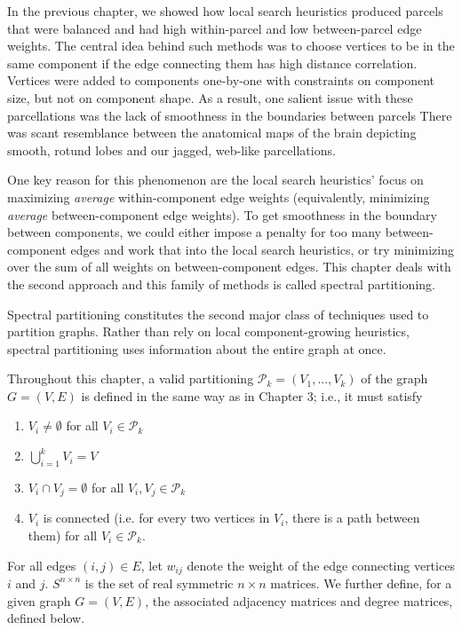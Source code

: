 In the previous chapter, we showed how local search heuristics produced
parcels that were balanced and had high within-parcel and low
between-parcel edge weights. The central idea behind such methods
was to choose vertices to be in the same component if the edge
connecting them has high distance correlation. Vertices were added to
components one-by-one with constraints on component size, but not on
component shape. As a result, one salient issue with these
parcellations was the lack of smoothness in the boundaries between parcels
There was scant resemblance between the anatomical maps
of the brain depicting smooth, rotund lobes and our jagged, web-like
parcellations.

One key reason for this phenomenon are the local search heuristics'
focus on maximizing \textit{average} within-component edge weights
(equivalently, minimizing \textit{average} between-component edge
weights). To get smoothness in the boundary between components, we
could either impose a penalty for too many between-component edges and
work that into the local search heuristics, or try minimizing over the
sum of all weights on between-component edges. This chapter deals with
the second approach and this family of methods is called spectral
partitioning.

Spectral partitioning constitutes the second major class of techniques
used to partition graphs. Rather than rely on local component-growing
heuristics, spectral partitioning uses information about the entire
graph at once.

Throughout this chapter, a valid partitioning
$\mathcal{P}_k = (V_1, ..., V_k)$ of the graph $G = (V, E)$ is defined in the
same way as in Chapter 3; i.e., it must satisfy

\begin{enumerate}[1.]
\item
$V_i \neq \emptyset$ for all $V_i \in \mathcal{P}_k$

\item
$\bigcup\limits_{i=1}^k V_i = V$

\item
$V_i \cap V_j = \emptyset$ for all $V_i, V_j \in \mathcal{P}_k$

\item
$V_i$ is connected (i.e. for every two vertices in $V_i$, there is a
path between them) for all $V_i \in \mathcal{P}_k$.
\end{enumerate}

For all edges $(i,j) \in E$, let $w_{ij}$ denote the weight of the edge
connecting vertices $i$ and $j$.
$S^{n \times n}$ is the set of real symmetric $n \times n$ matrices.
We further define, for a given graph $G = (V, E)$, the associated
adjacency matrices and degree matrices, defined below.

